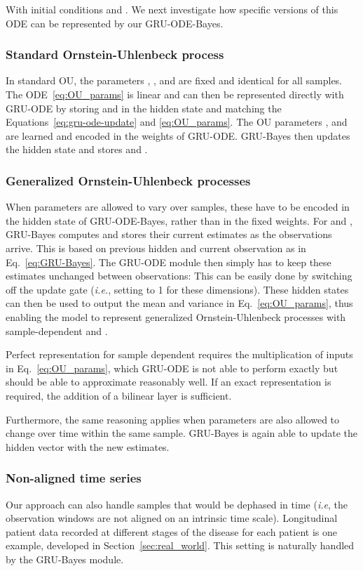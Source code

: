 \documentclass{article}
\newcommand{\method}{GRU-ODE-Bayes}
\begin{document}
With initial conditions  and . We next investigate how specific versions of this ODE can be represented by our \method{}.

\subsubsection{Standard Ornstein-Uhlenbeck process}
In standard OU, the parameters , , and  are fixed and identical for all samples. The ODE~\eqref{eq:OU_params} is linear and can then be represented directly with GRU-ODE by storing  and  in the hidden state  and matching the Equations~\eqref{eq:gru-ode-update} and \eqref{eq:OU_params}. The OU parameters ,  and  are learned and encoded in the weights of GRU-ODE. GRU-Bayes then updates the hidden state and stores  and .

\subsubsection{Generalized Ornstein-Uhlenbeck processes}
When parameters are allowed to vary over samples, these have to be encoded in the hidden state of GRU-ODE-Bayes, rather than in the fixed weights. For  and , GRU-Bayes  computes and stores their current estimates as the observations arrive. This is based on previous hidden and current observation as in Eq.~\ref{eq:GRU-Bayes}.
The GRU-ODE module then simply has to keep these estimates unchanged between observations:  This can be easily done by switching off the update gate (\emph{i.e.}, setting  to 1 for these dimensions).
These hidden states can then be used to output the mean and variance in Eq.~\ref{eq:OU_params}, thus enabling the model to represent generalized Ornstein-Uhlenbeck processes with sample-dependent  and .

Perfect representation for sample dependent  requires the multiplication of inputs in Eq.~\ref{eq:OU_params}, which GRU-ODE is not able to perform exactly but should be able to approximate reasonably well. If an exact representation is required, the addition of a bilinear layer is sufficient.
    
Furthermore, the same reasoning applies when parameters are also allowed to change over time within the same sample. GRU-Bayes is again able to update the hidden vector with the new estimates.

\subsubsection{Non-aligned time series}
Our approach can also handle samples that would be dephased in time
(\emph{i.e}, the observation windows are not aligned on an intrinsic time scale). 
Longitudinal patient data recorded at different stages of the disease for each patient is one example, developed in Section~\ref{sec:real_world}. This setting is naturally handled by the GRU-Bayes module.
\end{document}
